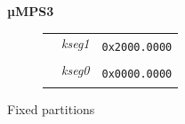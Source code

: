 \documentclass{beamer}
\begin{document}
\begin{frame}
\begin{center}
\begin{minipage}{0.45\textwidth}
\begin{block}{\textbf{µMPS3}}
\begin{figure}[h]
\begin{tabular}{rcl}
						\multicolumn{1}{r|}{}                                                               & \multicolumn{1}{c|}{\multirow{-2}{*}{{\cellcolor{nord9}\scriptsize \textit{kseg1}}}}          & \multirow{2}{*}{\texttt{{\tiny 0x2000.0000}}} \\ \hhline{--~}
						\multicolumn{1}{r|}{\multirow{2}{*}{\rotatebox{90}{{\scriptsize\!\!\!\!\!BIOS}}}}   & \multicolumn{1}{c|}{\cellcolor{nord7}}                                                        &                                               \\
						\multicolumn{1}{r|}{}                                                               & \multicolumn{1}{c|}{\multirow{-2}{*}{{\cellcolor{nord7}\scriptsize \textit{kseg0}}}}          & \multirow{2}{*}{\texttt{{\tiny 0x0000.0000}}} \\ \cline{2-2}
						\multicolumn{1}{l}{}                                                                &                                                                                               &
					\end{tabular}
				\end{figure}
				\begin{itemize}
					{\small \item Fixed partitions}
				\end{itemize}
			\end{block}
		\end{minipage}
	\end{center}
\end{frame}
\end{document}
